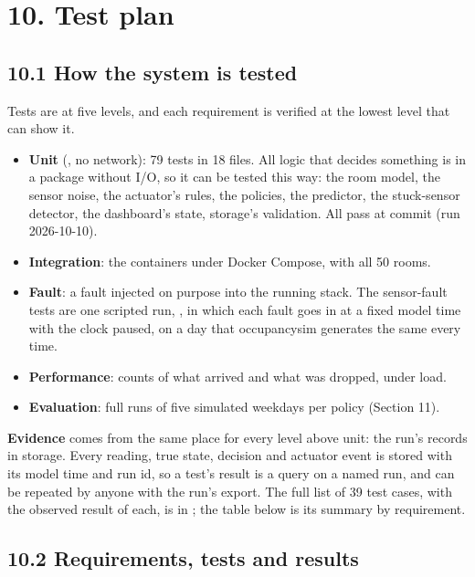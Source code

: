 \section{10. Test plan}

\subsection{10.1 How the system is tested}

Tests are at five levels, and each requirement is verified at the lowest level
that can show it.
\begin{itemize}
\tightlist
\item \textbf{Unit} (, no network): 79 tests in 18 files.
  All logic that decides something is in a package without I/O, so it can be
  tested this way: the room model, the sensor noise, the actuator's rules, the
  policies, the predictor, the stuck-sensor detector, the dashboard's state,
  storage's validation. All pass at commit  (run 2026-10-10).
\item \textbf{Integration}: the containers under Docker Compose, with all 50
  rooms.
\item \textbf{Fault}: a fault injected on purpose into the running stack. The
  sensor-fault tests are one scripted run, , in
  which each fault goes in at a fixed model time with the clock paused, on a
  day that occupancysim generates the same every time.
\item \textbf{Performance}: counts of what arrived and what was dropped,
  under load.
\item \textbf{Evaluation}: full runs of five simulated weekdays per policy
  (Section 11).
\end{itemize}

\textbf{Evidence} comes from the same place for every level above unit: the
run's records in storage. Every reading, true state, decision and actuator
event is stored with its model time and run id, so a test's result is a query
on a named run, and can be repeated by anyone with the run's export. The full
list of 39 test cases, with the observed result of each, is in
; the table below is its summary by requirement.

\subsection{10.2 Requirements, tests and results}

